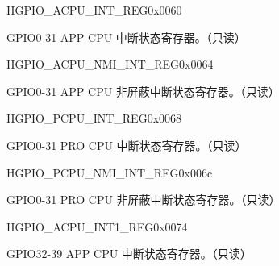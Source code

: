 \begin{register}{H}{GPIO\_ACPU\_INT\_REG}{0x0060}\label{regdesc:GPIOACPUINTREG}
%
\regnewline%
\begin{regdesc}\begin{reglist}
\item [GPIO\_ACPU\_INT\_REG]GPIO0-31 APP CPU 中断状态寄存器。（只读）
\end{reglist}\end{regdesc}
\end{register}


\begin{register}{H}{GPIO\_ACPU\_NMI\_INT\_REG}{0x0064}\label{regdesc:GPIOACPUNMIINTREG}
%
\regnewline%
\begin{regdesc}\begin{reglist}
\item [GPIO\_ACPU\_NMI\_INT\_REG]GPIO0-31 APP CPU 非屏蔽中断状态寄存器。（只读）
\end{reglist}\end{regdesc}
\end{register}


\begin{register}{H}{GPIO\_PCPU\_INT\_REG}{0x0068}\label{regdesc:GPIOPCPUINTREG}
%
\regnewline%
\begin{regdesc}\begin{reglist}
\item [GPIO\_PCPU\_INT\_REG]GPIO0-31 PRO CPU 中断状态寄存器。（只读）
\end{reglist}\end{regdesc}
\end{register}


\begin{register}{H}{GPIO\_PCPU\_NMI\_INT\_REG}{0x006c}\label{regdesc:GPIOPCPUNMIINTREG}
%
\regnewline%
\begin{regdesc}\begin{reglist}
\item [GPIO\_PCPU\_NMI\_INT\_REG]GPIO0-31 PRO CPU 非屏蔽中断状态寄存器。（只读）
\end{reglist}\end{regdesc}
\end{register}


\begin{register}{H}{GPIO\_ACPU\_INT1\_REG}{0x0074}\label{regdesc:GPIOACPUINT1REG}
%
%
\regnewline%
\begin{regdesc}\begin{reglist}
\item [GPIO\_APPCPU\_INT]GPIO32-39 APP CPU 中断状态寄存器。（只读）
\end{reglist}\end{regdesc}
\end{register}


